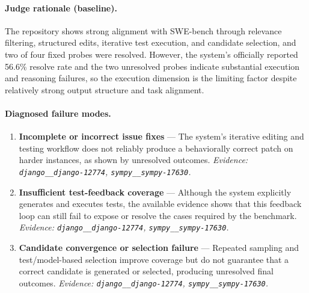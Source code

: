 \paragraph{Judge rationale (baseline).}
The repository shows strong alignment with SWE-bench through relevance filtering, structured edits, iterative test execution, and candidate selection, and two of four fixed probes were resolved. However, the system's officially reported 56.6\% resolve rate and the two unresolved probes indicate substantial execution and reasoning failures, so the execution dimension is the limiting factor despite relatively strong output structure and task alignment.
\paragraph{Diagnosed failure modes.}\begin{enumerate}\itemsep1pt
\item \textbf{Incomplete or incorrect issue fixes} --- The system's iterative editing and testing workflow does not reliably produce a behaviorally correct patch on harder instances, as shown by unresolved outcomes. \emph{Evidence: \texttt{django\_\_django-12774}, \texttt{sympy\_\_sympy-17630}.}
\item \textbf{Insufficient test-feedback coverage} --- Although the system explicitly generates and executes tests, the available evidence shows that this feedback loop can still fail to expose or resolve the cases required by the benchmark. \emph{Evidence: \texttt{django\_\_django-12774}, \texttt{sympy\_\_sympy-17630}.}
\item \textbf{Candidate convergence or selection failure} --- Repeated sampling and test/model-based selection improve coverage but do not guarantee that a correct candidate is generated or selected, producing unresolved final outcomes. \emph{Evidence: \texttt{django\_\_django-12774}, \texttt{sympy\_\_sympy-17630}.}
\end{enumerate}
